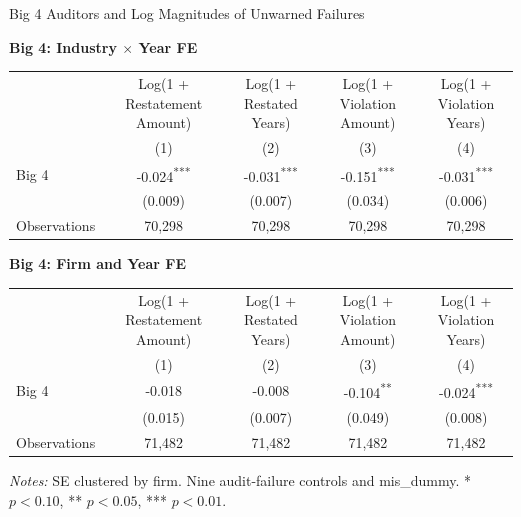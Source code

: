 \documentclass[10pt]{article}
\newcommand{\sym}[1]{\textsuperscript{#1}}
\begin{document}
\fontsize{10}{12}\selectfont
\setlength{\tabcolsep}{3pt}\renewcommand{\arraystretch}{1.15}
\begin{center}\large Big 4 Auditors and Log Magnitudes of Unwarned Failures\end{center}
\medskip\textbf{Big 4: Industry $\times$ Year FE}\par\smallskip
\begin{tabular*}{\textwidth}{@{\extracolsep{\fill}}lcccc@{}}
\toprule
 & \shortstack{Log(1 +\\Restatement Amount)} & \shortstack{Log(1 +\\Restated Years)} & \shortstack{Log(1 +\\Violation Amount)} & \shortstack{Log(1 +\\Violation Years)} \\
 & (1) & (2) & (3) & (4) \\
\midrule
Big 4 & -0.024\sym{***} & -0.031\sym{***} & -0.151\sym{***} & -0.031\sym{***} \\
 & (0.009) & (0.007) & (0.034) & (0.006) \\
Observations & 70,298 & 70,298 & 70,298 & 70,298 \\
\bottomrule\end{tabular*}\par
\medskip\textbf{Big 4: Firm and Year FE}\par\smallskip
\begin{tabular*}{\textwidth}{@{\extracolsep{\fill}}lcccc@{}}
\toprule
 & \shortstack{Log(1 +\\Restatement Amount)} & \shortstack{Log(1 +\\Restated Years)} & \shortstack{Log(1 +\\Violation Amount)} & \shortstack{Log(1 +\\Violation Years)} \\
 & (1) & (2) & (3) & (4) \\
\midrule
Big 4 & -0.018 & -0.008 & -0.104\sym{**} & -0.024\sym{***} \\
 & (0.015) & (0.007) & (0.049) & (0.008) \\
Observations & 71,482 & 71,482 & 71,482 & 71,482 \\
\bottomrule\end{tabular*}\par
\medskip\fontsize{9}{11}\selectfont\textit{Notes:} SE clustered by firm. Nine audit-failure controls and mis\_dummy. * $p<0.10$, ** $p<0.05$, *** $p<0.01$.
\end{document}
